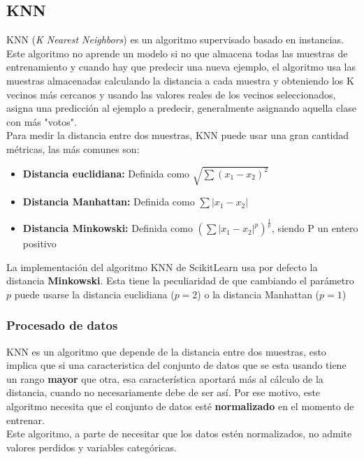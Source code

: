 \subsection{KNN}
\label{alg:knn}
KNN (\textit{K Nearest Neighbors}) es un algoritmo supervisado basado en instancias. Este algoritmo no aprende un modelo si no que almacena todas las muestras de entrenamiento y cuando hay que predecir una nueva ejemplo, el algoritmo usa las muestras almacenadas calculando la distancia a cada muestra y obteniendo los K vecinos más cercanos y usando las valores reales de los vecinos seleccionados, asigna una predicción al ejemplo a predecir, generalmente asignando aquella clase con más "votos".\\
\linebreak
Para medir la distancia entre dos muestras, KNN puede usar una gran cantidad métricas, las más comunes son:
\begin{itemize}
	\item \textbf{Distancia euclidiana:} Definida como $\sqrt{\sum(x_1 - x_2)^2}$
	\item \textbf{Distancia Manhattan:} Definida como $\sum|x_1 - x_2|$
	\item \textbf{Distancia Minkowski:} Definida como $(\sum|x_1 - x_2|^p)^{\frac{1}{p}}$, siendo P un entero positivo
\end{itemize}
La implementación del algoritmo KNN de ScikitLearn usa por defecto la distancia \textbf{Minkowski}. Esta tiene la peculiaridad de que cambiando el parámetro $p$ puede usarse la distancia euclidiana ($p=2$) o la distancia Manhattan ($p=1$)
\subsubsection*{Procesado de datos}
KNN es un algoritmo que depende de la distancia entre dos muestras, esto implica que si una caracteristica del conjunto de datos que se esta usando tiene un rango \textbf{mayor} que otra, esa característica aportará más al cálculo de la distancia, cuando no necesariamente debe de ser así. Por ese motivo, este algoritmo necesita que el conjunto de datos esté \textbf{normalizado} en el momento de entrenar.\\
\linebreak
Este algoritmo, a parte de necesitar que los datos estén normalizados, no admite valores perdidos y variables categóricas.

